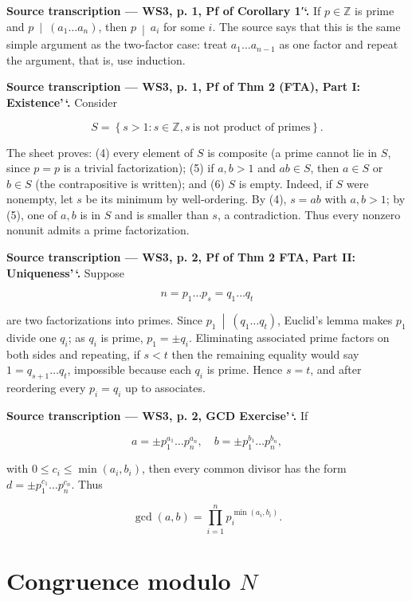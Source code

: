 \textbf{Source transcription --- WS3, p. 1, Pf of Corollary 1′`.} If \(p \in \mathbb{Z}\) is prime and \(\left. p\  \middle| \ \left( {a_{1}\ldots a_{n}} \right) \right.\), then \(\left. p\  \middle| \ a_{i} \right.\) for some \(i\). The source says that this is the same simple argument as the two-factor case: treat \(a_{1}\ldots a_{n - 1}\) as one factor and repeat the argument, that is, use induction.

\textbf{Source transcription --- WS3, p. 1, Pf of Thm 2 (FTA), Part I: Existence'\,`.} Consider

\[S = \left\{ {s > 1:s \in \mathbb{Z},s\ \text{is not product of primes}} \right\}.\]

The sheet proves: (4) every element of \(S\) is composite (a prime cannot lie in \(S\), since \(p = p\) is a trivial factorization); (5) if \(a,b > 1\) and \(ab \in S\), then \(a \in S\) or \(b \in S\) (the contrapositive is written); and (6) \(S\) is empty. Indeed, if \(S\) were nonempty, let \(s\) be its minimum by well-ordering. By (4), \(s = ab\) with \(a,b > 1\); by (5), one of \(a,b\) is in \(S\) and is smaller than \(s\), a contradiction. Thus every nonzero nonunit admits a prime factorization.

\textbf{Source transcription --- WS3, p. 2, Pf of Thm 2 FTA, Part II: Uniqueness'\,`.} Suppose

\[n = p_{1}\ldots p_{s} = q_{1}\ldots q_{t}\]

are two factorizations into primes. Since \(\left. p_{1}\  \middle| \ \left( {q_{1}\ldots q_{t}} \right) \right.\), Euclid's lemma makes \(p_{1}\) divide one \(q_{i}\); as \(q_{i}\) is prime, \(p_{1} = \pm q_{i}\). Eliminating associated prime factors on both sides and repeating, if \(s < t\) then the remaining equality would say \(1 = q_{s + 1}\ldots q_{t}\), impossible because each \(q_{i}\) is prime. Hence \(s = t\), and after reordering every \(p_{i} = q_{i}\) up to associates.

\textbf{Source transcription --- WS3, p. 2, GCD Exercise'\,`.} If

\[a = \pm p_{1}^{a_{1}}\ldots p_{n}^{a_{n}},\quad b = \pm p_{1}^{b_{1}}\ldots p_{n}^{b_{n}},\]

with \(0 \leq c_{i} \leq \min\left( {a_{i},b_{i}} \right)\), then every common divisor has the form \(d = \pm p_{1}^{c_{1}}\ldots p_{n}^{c_{n}}\). Thus

\[\gcd\left( {a,b} \right) = \prod\limits_{i = 1}^{n}p_{i}^{\min{({a_{i},b_{i}})}}.\]

\section{\texorpdfstring{Congruence modulo \(N\)}{Congruence modulo N}}

